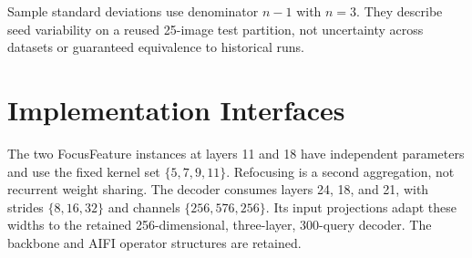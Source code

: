 \documentclass[journal]{IEEEtran}
\begin{document}
Sample standard deviations use denominator $n-1$ with $n=3$. They describe seed variability on a reused 25-image test partition, not uncertainty across datasets or guaranteed equivalence to historical runs.

\section{Implementation Interfaces}
The two FocusFeature instances at layers 11 and 18 have independent parameters and use the fixed kernel set $\{5,7,9,11\}$. Refocusing is a second aggregation, not recurrent weight sharing. The decoder consumes layers 24, 18, and 21, with strides $\{8,16,32\}$ and channels $\{256,576,256\}$. Its input projections adapt these widths to the retained 256-dimensional, three-layer, 300-query decoder. The backbone and AIFI operator structures are retained.
\end{document}
